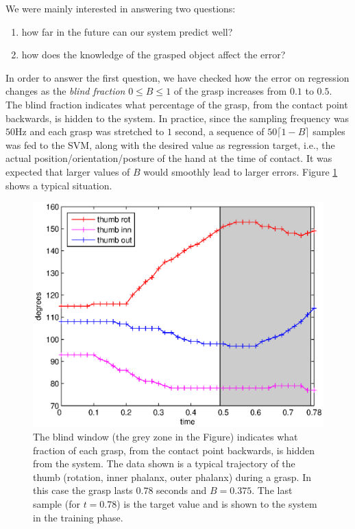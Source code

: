 We were mainly interested in answering two questions:

\begin{enumerate}

  \item how far in the future can our system predict well?

  \item how does the knowledge of the grasped object affect the error?

\end{enumerate}

In order to answer the first question, we have checked how the error
on regression changes as the \emph{blind fraction} $0 \leq B \leq 1$
of the grasp increases from $0.1$ to $0.5$. The blind fraction
indicates what percentage of the grasp, from the contact point
backwards, is hidden to the system. In practice, since the sampling
frequency was $50$Hz and each grasp was stretched to $1$ second, a
sequence of $50 \lceil 1-B \rceil$ samples was fed to the SVM, along
with the desired value as regression target, i.e., the actual
position/orientation/posture of the hand at the time of contact. It
was expected that larger values of $B$ would smoothly lead to larger
errors. Figure \ref{fig:B_example} shows a typical situation.

\begin{figure}[htbp]
  \begin{center}
    \includegraphics[width=0.5\linewidth]{B_example.eps}
    \caption{The blind window (the grey zone in the Figure) indicates
    what fraction of each grasp, from the contact point backwards, is
    hidden from the system. The data shown is a typical trajectory of
    the thumb (rotation, inner phalanx, outer phalanx) during a
    grasp. In this case the grasp lasts $0.78$ seconds and
    $B=0.375$. The last sample (for $t=0.78$) is the target value and
    is shown to the system in the training phase.}
    \label{fig:B_example}
  \end{center}
\end{figure}

